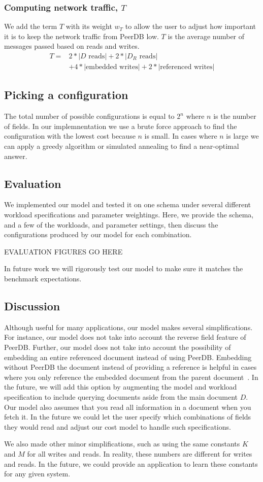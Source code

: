 \subsubsection{Computing network traffic, $T$}
We add the term $T$ with its weight $w_T$ to allow the user to adjust how important it is to keep the network traffic from PeerDB low. $T$ is the average number of messages passed based on reads and writes. 
\begin{align*}
T=& 2*|D\text{ reads}| + 2*|D_R\text{ reads}|\\
& + 4*|\text{embedded writes}| + 2*|\text{referenced writes}| 
\end{align*}

\subsection{Picking a configuration}
The total number of possible configurations is equal to $2^n$ where $n$ is the number of fields. In our implemnentation we use a brute force approach to find the configuration with the lowest cost because $n$ is small. In cases where $n$ is large we can apply a greedy algorithm or simulated annealing to find a near-optimal answer.

\subsection{Evaluation}
We implemented our model and tested it on one schema under several different workload specifications and parameter weightings. Here, we provide the schema, and a few of the workloads, and parameter settings, then discuss the configurations produced by our model for each combination. 

EVALUATION FIGURES GO HERE

In future work we will rigorously test our model to make sure it matches the benchmark expectations.

\subsection{Discussion}
Although useful for many applications, our model makes several simplifications. For instance, our model does not take into account the reverse field feature of PeerDB. Further, our model does not take into account the possibility of embedding an entire referenced document instead of using PeerDB. Embedding without PeerDB the document instead of providing a reference is helpful in cases where you only reference the embedded document from the parent document~\cite{MongoDB2014}. In the future, we will add this option by augmenting the model and workload specification to include querying documents aside from the main document $D$. Our model also assumes that you read all information in a document when you fetch it. In the future we could let the user specify which combinations of fields they would read and adjust our cost model to handle such specifications.

We also made other minor simplifications, such as using the same constants $K$ and $M$ for all writes and reads. In reality, these numbers are different for writes and reads. In the future, we could provide an application to learn these constants for any given system. 
